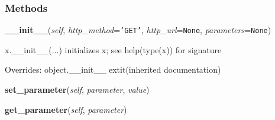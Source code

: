   \subsubsection{Methods}

    \vspace{0.5ex}

\hspace{.8\funcindent}\begin{boxedminipage}{\funcwidth}

    \raggedright \textbf{\_\_init\_\_}(\textit{self}, \textit{http\_method}={\tt \texttt{'}\texttt{GET}\texttt{'}}, \textit{http\_url}={\tt None}, \textit{parameters}={\tt None})

\setlength{\parskip}{2ex}
    x.\_\_init\_\_(...) initializes x; see help(type(x)) for signature

\setlength{\parskip}{1ex}
      Overrides: object.\_\_init\_\_ 	extit{(inherited documentation)}

    \end{boxedminipage}

    \label{lib:oauth:OAuthRequest:set_parameter}

    \vspace{0.5ex}

\hspace{.8\funcindent}\begin{boxedminipage}{\funcwidth}

    \raggedright \textbf{set\_parameter}(\textit{self}, \textit{parameter}, \textit{value})

\setlength{\parskip}{2ex}
\setlength{\parskip}{1ex}
    \end{boxedminipage}

    \label{lib:oauth:OAuthRequest:get_parameter}

    \vspace{0.5ex}

\hspace{.8\funcindent}\begin{boxedminipage}{\funcwidth}

    \raggedright \textbf{get\_parameter}(\textit{self}, \textit{parameter})

\setlength{\parskip}{2ex}
\setlength{\parskip}{1ex}
    \end{boxedminipage}

